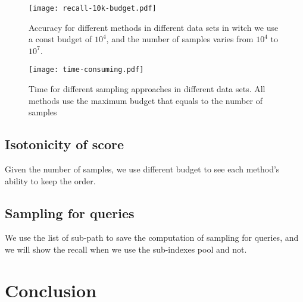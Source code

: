 \documentclass[letterpaper]{article}
\begin{document}
\begin{figure}[ht]
  \centering
  \texttt{[image: recall-10k-budget.pdf]}\\
  \caption{Accuracy for different methods in different data sets in witch we use a const budget of $10^4$, and the number of samples varies from $10^4$ to $10^7$.}
  \label{Fig:Recall10kBudget}
\end{figure}

\begin{figure}[ht]
  \centering
  \texttt{[image: time-consuming.pdf]}\\
  \caption{Time for different sampling approaches in different data sets. All methods use the maximum budget that equals to the number of samples}
  \label{Fig:Recall10kBudget}
\end{figure}
\subsection{Isotonicity of score}
Given the number of samples, we use different budget to see each method's ability to keep the order.

\subsection{Sampling for queries}
We use the list of sub-path to save the computation of sampling for queries, and we will show the recall when we use the sub-indexes pool and not.

\section{Conclusion}




\end{document}
